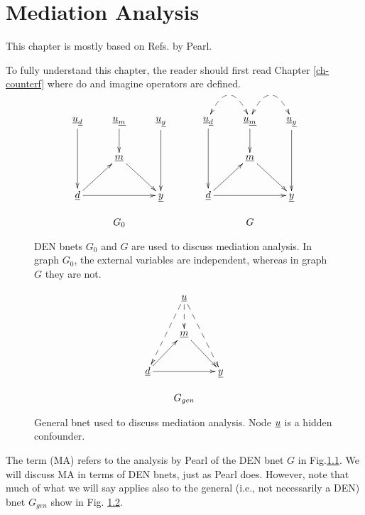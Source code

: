 \chapter{Mediation Analysis}
\label{ch-mediation}
This chapter is mostly based on 
Refs.\cite{pearl-2019review,
pearl2012-mediation} by Pearl.

To fully
understand this chapter,
the reader should first read Chapter \ref{ch-counterf}
where do and imagine operators are defined.


\begin{figure}[h!]
$$
\begin{array}{ccc}
\\
\xymatrix{
\rvu_\rvd\ar[dd]
&\rvu_\rvm\ar[d]
&\rvu_\rvy\ar[dd]
\\
&\rvm\ar[rd]
\\
\rvd\ar[ru]\ar[rr]&&\rvy
}
&\;\;\;\;&
\xymatrix{
\rvu_\rvd\ar[dd]\ar@/^2pc/@{<-->}[r]
&\rvu_\rvm\ar[d]\ar@/^2pc/@{<-->}[r]
&\rvu_\rvy\ar[dd]
\\
&\rvm\ar[rd]
\\
\rvd\ar[ru]\ar[rr]&&\rvy
}
\\
\\
G_0&&G
\end{array}
$$
\caption{DEN bnets $G_0$ and $G$
are used to 
discuss mediation analysis.
In graph
$G_0$,
the external
variables are independent,
whereas in graph $G$
they are not.}
\label{fig-mediation-bnets}
\end{figure}

\begin{figure}[h!]
$$
\begin{array}{c}
\xymatrix{
&\rvu
\ar@{-->}[d]
\ar@{-->}[ldd]
\ar@{-->}[rdd]
\\
&\rvm\ar[rd]
\\
\rvd\ar[ru]\ar[rr]&&\rvy
}
\\
\\
G_{gen}
\end{array}
$$
\caption{General bnet used to 
discuss mediation analysis.
Node $\rvu$ is a hidden confounder.}
\label{fig-gen-bnet-mediation}
\end{figure}

The term  (MA)
refers
to  the analysis by Pearl
of the DEN bnet
$G$
in Fig.\ref{fig-mediation-bnets}.
We will discuss MA in terms
of DEN bnets, just as Pearl does.
However, note that much of 
what we will say applies also to 
the general (i.e., not
necessarily a DEN) bnet $G_{gen}$
show in Fig. \ref{fig-gen-bnet-mediation}.



